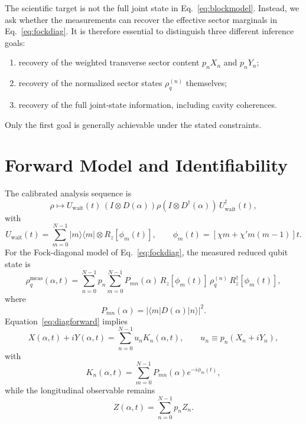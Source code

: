 \documentclass[11pt]{article}
\begin{document}
The scientific target is not the full joint state in Eq.~\eqref{eq:blockmodel}.
Instead, we ask whether the measurements can recover the effective sector
marginals in Eq.~\eqref{eq:fockdiag}. It is therefore essential to distinguish
three different inference goals:
\begin{enumerate}[label=\arabic*.]
\item recovery of the weighted transverse sector content
$p_n X_n$ and $p_n Y_n$;
\item recovery of the normalized sector states $\rho_q^{(n)}$ themselves;
\item recovery of the full joint-state information, including cavity
coherences.
\end{enumerate}
Only the first goal is generally achievable under the stated constraints.

\section{Forward Model and Identifiability}
The calibrated analysis sequence is
\begin{equation}
\rho \mapsto U_{\mathrm{wait}}(t)\,
\left(I\otimes D(\alpha)\right)\rho
\left(I\otimes D^\dagger(\alpha)\right)\,
U_{\mathrm{wait}}^\dagger(t),
\end{equation}
with
\begin{equation}
U_{\mathrm{wait}}(t)=\sum_{m=0}^{N-1}
|m\rangle\!\langle m|\otimes R_z[\phi_m(t)],
\qquad
\phi_m(t)=\left[\chi m + \chi' m(m-1)\right]t.
\label{eq:waitunitary}
\end{equation}
For the Fock-diagonal model of Eq.~\eqref{eq:fockdiag}, the measured reduced
qubit state is
\begin{equation}
\rho_q^{\mathrm{meas}}(\alpha,t) =
\sum_{n=0}^{N-1} p_n \sum_{m=0}^{N-1}
P_{mn}(\alpha)\,
R_z[\phi_m(t)]\,\rho_q^{(n)}\,R_z^\dagger[\phi_m(t)],
\label{eq:diagforward}
\end{equation}
where
\begin{equation}
P_{mn}(\alpha)=|\langle m|D(\alpha)|n\rangle|^2.
\end{equation}
Equation~\eqref{eq:diagforward} implies
\begin{equation}
X(\alpha,t)+iY(\alpha,t)=
\sum_{n=0}^{N-1} u_n K_n(\alpha,t),
\qquad
u_n \equiv p_n(X_n+iY_n),
\label{eq:recoverablekernel}
\end{equation}
with
\begin{equation}
K_n(\alpha,t)=\sum_{m=0}^{N-1} P_{mn}(\alpha)e^{-i\phi_m(t)},
\end{equation}
while the longitudinal observable remains
\begin{equation}
Z(\alpha,t)=\sum_{n=0}^{N-1} p_n Z_n.
\label{eq:zcollapse}
\end{equation}
\end{document}

